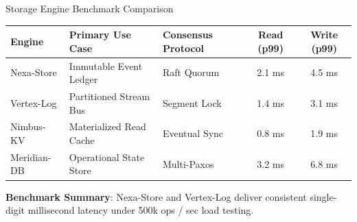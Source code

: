\documentclass[
  style=simple,
  size=11pt,
  paper=screen,
  orient=landscape
]{powerdot}
\begin{document}
\begin{slide}{Storage Engine Benchmark Comparison}
\footnotesize
\centering
\begin{tabularx}{0.96\textwidth}{l X X c c}
\toprule
\textbf{Engine} & \textbf{Primary Use Case} & \textbf{Consensus Protocol} & \textbf{Read (p99)} & \textbf{Write (p99)} \\
\midrule
Nexa-Store & Immutable Event Ledger & Raft Quorum & 2.1 ms & 4.5 ms \\{}
Vertex-Log & Partitioned Stream Bus & Segment Lock & 1.4 ms & 3.1 ms \\{}
Nimbus-KV & Materialized Read Cache & Eventual Sync & 0.8 ms & 1.9 ms \\{}
Meridian-DB & Operational State Store & Multi-Paxos & 3.2 ms & 6.8 ms \\
\bottomrule
\end{tabularx}

\vspace{0.8em}
\begin{tcolorbox}[cardbox]
\small \textbf{Benchmark Summary}: Nexa-Store and Vertex-Log deliver consistent single-digit millisecond latency under 500k ops / sec load testing.
\end{tcolorbox}
\end{slide}
\end{document}
